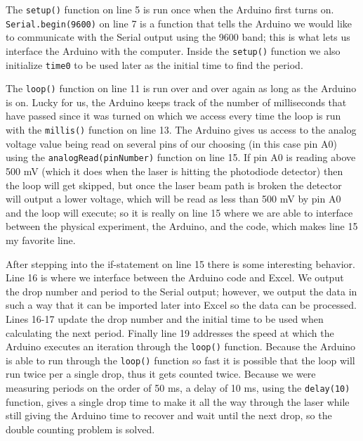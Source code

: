 \documentclass[11pt]{article}
\begin{document}
The \texttt{setup()} function on line 5 is run once when the Arduino first turns on. \texttt{Serial.begin(9600)} on line 7 is a function that tells the Arduino we would like to communicate with the Serial output using the 9600 band; this is what lets us interface the Arduino with the computer. Inside the \texttt{setup()} function we also initialize \texttt{time0} to be used later as the initial time to find the period.

The \texttt{loop()} function on line 11 is run over and over again as long as the Arduino is on. Lucky for us, the Arduino keeps track of the number of milliseconds that have passed since it was turned on which we access every time the loop is run with the \texttt{millis()} function on line 13. The Arduino gives us access to the analog voltage value being read on several pins of our choosing (in this case pin A0) using the \texttt{analogRead(pinNumber)} function on line 15. If pin A0 is reading above 500 mV (which it does when the laser is hitting the photodiode detector) then the loop will get skipped, but once the laser beam path is broken the detector will output a lower voltage, which will be read as less than 500 mV by pin A0 and the loop will execute; so it is really on line 15 where we are able to interface between the physical experiment, the Arduino, and the code, which makes line 15 my favorite line.

After stepping into the if-statement on line 15 there is some interesting behavior. Line 16 is where we interface between the Arduino code and Excel. We output the drop number and period to the Serial output; however, we output the data in such a way that it can be imported later into Excel so the data can be processed. Lines 16-17 update the drop number and the initial time to be used when calculating the next period. Finally line 19 addresses the speed at which the Arduino executes an iteration through the \texttt{loop()} function. Because the Arduino is able to run through the \texttt{loop()} function so fast it is possible that the loop will run twice per a single drop, thus it gets counted twice. Because we were measuring periods on the order of 50 ms, a delay of 10 ms, using the \texttt{delay(10)} function, gives a single drop time to make it all the way through the laser while still giving the Arduino time to recover and wait until the next drop, so the double counting problem is solved.

\end{document}
